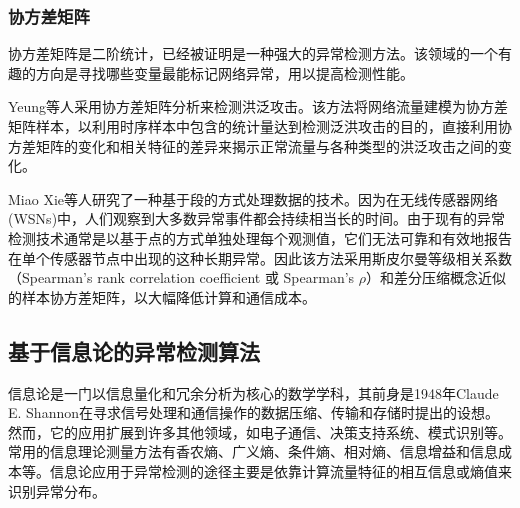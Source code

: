 \subsubsection{协方差矩阵}

协方差矩阵是二阶统计，已经被证明是一种强大的异常检测方法。该领域的一个有趣的方向是寻找哪些变量最能标记网络异常，用以提高检测性能。

Yeung等人\cite{yeung2007covariance}采用协方差矩阵分析来检测洪泛攻击。该方法将网络流量建模为协方差矩阵样本，以利用时序样本中包含的统计量达到检测泛洪攻击的目的，直接利用协方差矩阵的变化和相关特征的差异来揭示正常流量与各种类型的洪泛攻击之间的变化。


 Miao Xie等人\cite{xie2014segment}研究了一种基于段的方式处理数据的技术。因为在无线传感器网络(WSNs)中，人们观察到大多数异常事件都会持续相当长的时间。由于现有的异常检测技术通常是以基于点的方式单独处理每个观测值，它们无法可靠和有效地报告在单个传感器节点中出现的这种长期异常。因此该方法采用斯皮尔曼等级相关系数（Spearman's rank correlation coefficient 或 Spearman's $\rho$）和差分压缩概念近似的样本协方差矩阵，以大幅降低计算和通信成本。










\subsection{基于信息论的异常检测算法}

信息论是一门以信息量化和冗余分析为核心的数学学科，其前身是1948年Claude E. Shannon在寻求信号处理和通信操作的数据压缩、传输和存储时提出的设想\cite{shannon1948mathematical}。然而，它的应用扩展到许多其他领域，如电子通信、决策支持系统、模式识别等。常用的信息理论测量方法有香农熵、广义熵、条件熵、相对熵、信息增益和信息成本等。信息论应用于异常检测的途径主要是依靠计算流量特征的相互信息或熵值来识别异常分布。

